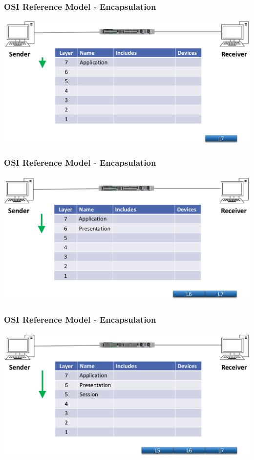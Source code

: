 \documentclass[pdflatex,compress]{beamer}
\begin{document}
\begin{frame}
	\frametitle{OSI Reference Model - Encapsulation}
	\begin{center}
		\includegraphics[width=\linewidth]{img/img02}
	\end{center}
\end{frame}

\begin{frame}
	\frametitle{OSI Reference Model - Encapsulation}
	\begin{center}
		\includegraphics[width=\linewidth]{img/img03}
	\end{center}
\end{frame}

\begin{frame}
	\frametitle{OSI Reference Model - Encapsulation}
	\begin{center}
		\includegraphics[width=\linewidth]{img/img04}
	\end{center}
\end{frame}
\end{document}
